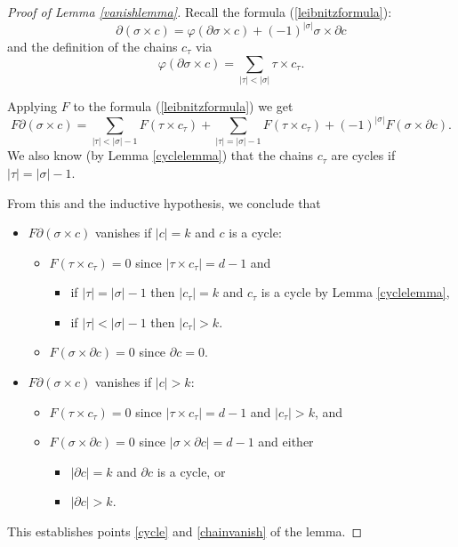 \documentclass[10pt,a4paper]{amsart}
\begin{document}
\begin{proof}[Proof of Lemma \ref{vanishlemma}]



Recall the formula (\ref{leibnitzformula}): $$
\partial(\sigma\times c)=\varphi(\partial\sigma\times c)+(-1)^{|\sigma|}\sigma\times \partial c
$$ 
and the definition of the chains $c_{\tau}$ via $$\varphi(\partial\sigma\times c)=\sum_{|\tau|<|\sigma|}\tau\times c_{\tau}.
$$


Applying $F$ to the formula (\ref{leibnitzformula}) we get %
$$
F\partial(\sigma\times c)=\sum_{|\tau|<|\sigma|-1}F(\tau\times c_{\tau})+\sum_{|\tau|=|\sigma|-1}F(\tau\times c_{\tau})+(-1)^{|\sigma|}F(\sigma\times\partial c). 
$$
We also know (by Lemma \ref{cyclelemma}) that the chains $c_{\tau}$ are cycles if $|\tau|=|\sigma|-1$. 

From this and the inductive hypothesis, we conclude that \begin{itemize}
\item 
$F\partial(\sigma\times c)$ vanishes if
$|c|=k$ and $c$ is a cycle: 
\begin{itemize}
\item 
$F(\tau\times c_{\tau})=0$ since $|\tau\times c_{\tau}|=d-1$ and 
\begin{itemize}
\item 
if $|\tau|=|\sigma|-1$ then $|c_{\tau}|=k$ and $c_{\tau}$ is a cycle by Lemma \ref{cyclelemma}, 
\item
if $|\tau|<|\sigma|-1$ then $|c_{\tau}|>k$. 
\end{itemize}
\item 
$F(\sigma\times\partial c)=0$ since $\partial c=0$.
\end{itemize}
\item 
$F\partial(\sigma\times c)$ vanishes if
$|c|>k$:
\begin{itemize}
\item 
$F(\tau\times c_{\tau})=0$ since $|\tau\times c_{\tau}|=d-1$ and $|c_{\tau}|>k$, and 
\item 
$F(\sigma\times\partial c)=0$ since $|\sigma\times\partial c|=d-1$ and either 
\begin{itemize}
\item 
$|\partial c|=k$ and $\partial c$ is a cycle, or
\item 
$|\partial c|>k$.
\end{itemize}
\end{itemize}
\end{itemize}
This establishes points \ref{cycle} and \ref{chainvanish} of the lemma. 


\end{proof}
\end{document}
